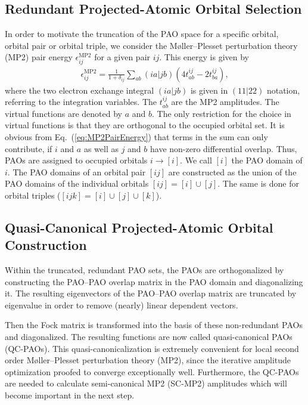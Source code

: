 \subsection{Redundant Projected-Atomic Orbital Selection}
In order to motivate the truncation of the PAO space for a specific orbital, orbital pair or orbital triple,
we consider the M{\o}ller--Plesset perturbation theory (MP2) pair energy $\epsilon_{ij}^\mathrm{MP2}$ for
a given pair $ij$. This energy is given by~\cite{Pulay1983}
\begin{align}
  \epsilon_{ij}^\mathrm{MP2} = \frac{1}{1+\delta_{ij}}\sum_{ab}{(ia|jb)}(4t^{ij}_{ab}-2t^{ij}_{ba}),
  \label{eq:MP2PairEnergy}
\end{align}
where the two electron exchange integral $(ia|jb)$ is given in $(11|22)$ notation, referring to the integration
variables. The $t^{ij}_{ab}$ are the MP2 amplitudes. The virtual functions are denoted by $a$ and $b$.
The only restriction for the choice in virtual functions is that they are orthogonal to the occupied orbital set.
It is obvious from Eq.~(\ref{eq:MP2PairEnergy}) that terms in the sum can only contribute, if $i$ and $a$ as well as $j$
and $b$ have non-zero differential overlap. Thus, PAOs are assigned to occupied orbitals $i\rightarrow [i]$.
We call $[i]$ the PAO domain of $i$. The PAO domains of an orbital pair $[ij]$ are constructed
as the union of the PAO domains of the individual orbitals $[ij]=[i]\cup [j]$. The same is done for orbital
triples ($[ijk]=[i]\cup [j]\cup [k]$).

\subsection{Quasi-Canonical Projected-Atomic Orbital Construction}
Within the truncated, redundant PAO sets, the PAOs are orthogonalized by constructing the PAO--PAO overlap matrix
in the PAO domain and diagonalizing it. The resulting eigenvectors of the PAO--PAO overlap matrix are
truncated by eigenvalue in order to remove (nearly) linear dependent vectors.

Then the Fock matrix is transformed into the basis of these non-redundant PAOs and diagonalized. The resulting functions
are now called quasi-canonical PAOs (QC-PAOs). This quasi-canonicalization is extremely convenient for local
second order M{\o}ller--Plesset perturbation theory (MP2), since the iterative amplitude optimization proofed
to converge exceptionally well. Furthermore, the QC-PAOs are needed to calculate semi-canonical MP2 (SC-MP2)
amplitudes which will become important in the next step.

